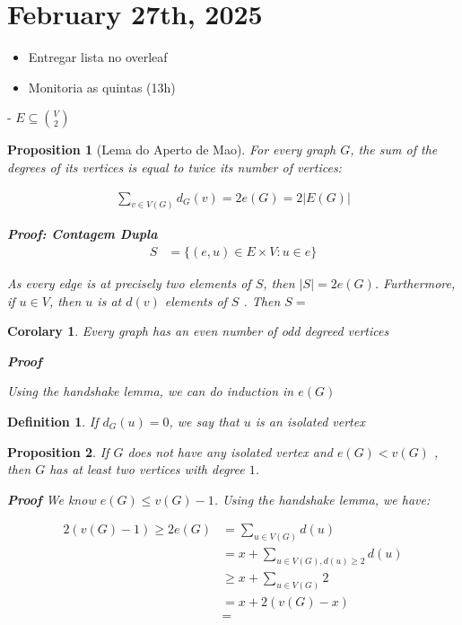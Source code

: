 \documentclass{article}
\newtheorem{definition}{Definition}[section]
\newtheorem{proposition}{Proposition}
\newtheorem{corolary}{Corolary}
\begin{document}
\section{February 27th, 2025}


\begin{itemize}
	\item  Entregar lista no overleaf
	\item Monitoria as quintas (13h)
\end{itemize}

- $E \subseteq \binom{V}{2}$


\begin{proposition}[Lema do Aperto de Mao]
	\label{def:lema_aperto_de_mao}
	For  every graph $G$, the sum of the degrees of its vertices is equal to twice its number of vertices:
	
	\begin{align}
		\sum_{v \in V(G)} d_{G}(v) = 2e(G) = 2|E(G)|
	\end{align}
	
	\textbf{Proof: Contagem Dupla}
	\begin{align}
	 	S &= \{ (e, u) \in E \times V :  u \in e  \}
	\end{align}
	
	As every edge is at precisely two elements of $S$, then $|S| = 2e(G)$. Furthermore, if $u \in V$, then $u$ is at $d(v)$ elements of $S$ . Then $S = $ 
	
\end{proposition}

\begin{corolary}
	Every graph has an even number of odd degreed vertices
	
	\textbf{Proof}
	
	Using the handshake lemma, we can do induction in $e(G)$
\end{corolary}


\begin{definition}
		If $d_G(u) = 0$, we say that $u$ is an isolated vertex
\end{definition}

\begin{proposition}
	If $G$ does not have any isolated vertex and $e(G) <  v(G)$ , then $G$ has at least two vertices with degree $1$.
	
	\textbf{Proof}
	We know $e(G) \leq v(G) - 1$. Using the handshake lemma, we have:
	
	\begin{align}
		2(v(G) - 1) \geq 2e(G) &=  \sum_{u \in V(G)} d(u) \\
		&= x + \sum_{u \in V(G), d(u) \geq 2} d(u) \\
		&\geq  x + \sum_{u \in V(G)} 2 \\
		&= x +  2(v(G) - x) \\
		&= 
	\end{align}
\end{proposition}
\end{document}
